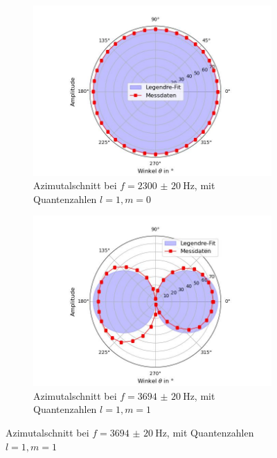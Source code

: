 \documentclass[../main.tex]{subfiles}
\begin{document}
        \begin{figure}[H]
            \centering
            \begin{subfigure}[b]{0.45\textwidth}
                \centering
                \includegraphics[width=\textwidth]{Bilddateien/Auswertung/III_jk_Polschnitt_2093_0.jpg}
                \caption{Azimutalschnitt bei $f=\SI{2300(20)}{\hertz}$, mit Quantenzahlen $l=1, m=0$}
                \label{fig:III_jk_Polschnitt_2093_0}
            \end{subfigure}
            \hfill
            \begin{subfigure}[b]{0.45\textwidth}
                \centering
                \includegraphics[width=\textwidth]{Bilddateien/Auswertung/III_jk_Polschnitt_2263_1.jpg}
                \caption{Azimutalschnitt bei $f=\SI{3694(20)}{\hertz}$, mit Quantenzahlen $l=1, m=1$}

\end{subfigure}
\end{figure}
\end{document}

